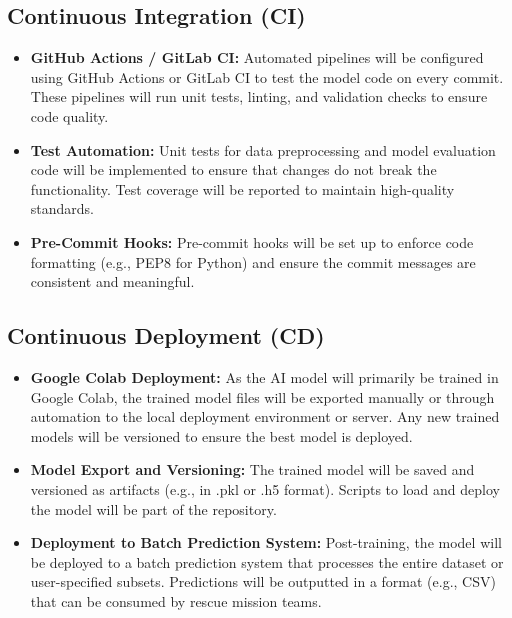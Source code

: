 \documentclass[15pt]{article}
\begin{document}
\subsection{Continuous Integration (CI)}
\begin{itemize}
    \item \textbf{GitHub Actions / GitLab CI:} Automated pipelines will be configured using GitHub Actions or GitLab CI to test the model code on every commit. These pipelines will run unit tests, linting, and validation checks to ensure code quality.
    \item \textbf{Test Automation:} Unit tests for data preprocessing and model evaluation code will be implemented to ensure that changes do not break the functionality. Test coverage will be reported to maintain high-quality standards.
    \item \textbf{Pre-Commit Hooks:} Pre-commit hooks will be set up to enforce code formatting (e.g., PEP8 for Python) and ensure the commit messages are consistent and meaningful.
\end{itemize}

\subsection{Continuous Deployment (CD)}
\begin{itemize}
    \item \textbf{Google Colab Deployment:} As the AI model will primarily be trained in Google Colab, the trained model files will be exported manually or through automation to the local deployment environment or server. Any new trained models will be versioned to ensure the best model is deployed.
    \item \textbf{Model Export and Versioning:} The trained model will be saved and versioned as artifacts (e.g., in .pkl or .h5 format). Scripts to load and deploy the model will be part of the repository.
    \item \textbf{Deployment to Batch Prediction System:} Post-training, the model will be deployed to a batch prediction system that processes the entire dataset or user-specified subsets. Predictions will be outputted in a format (e.g., CSV) that can be consumed by rescue mission teams.
\end{itemize}
\end{document}
